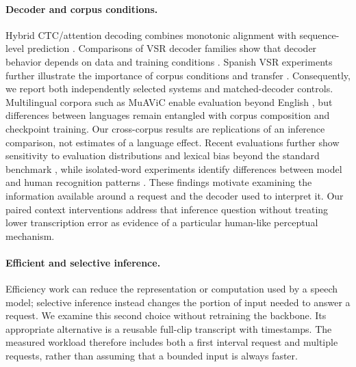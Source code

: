 \paragraph{Decoder and corpus conditions.}
Hybrid CTC/attention decoding combines monotonic alignment with sequence-level
prediction \citep{watanabe2017hybrid}. Comparisons of VSR decoder families show
that decoder behavior depends on data and training conditions
\citep{gimeno2024decoders}. Spanish VSR experiments further illustrate the
importance of corpus conditions and transfer \citep{gimeno2025spanish}.
Consequently, we report both independently selected systems and matched-decoder
controls. Multilingual corpora such as MuAViC enable evaluation beyond English
\citep{anwar2023muavic}, but differences between languages remain entangled with
corpus composition and checkpoint training. Our cross-corpus results are
replications of an inference comparison, not estimates of a language effect.
Recent evaluations further show sensitivity to evaluation distributions and lexical bias
beyond the standard benchmark \citep{lin2026generalisability}, while isolated-word
experiments identify differences between model and human recognition patterns
\citep{jain2026lipreadinggap}. These findings motivate examining the information
available around a request and the decoder used to interpret it. Our paired
context interventions address that inference question without treating lower
transcription error as evidence of a particular human-like perceptual mechanism.

\paragraph{Efficient and selective inference.}
Efficiency work can reduce the representation or computation used by a speech
model; selective inference instead changes the portion of input needed to answer
a request. We examine this second choice without retraining the backbone.
Its appropriate alternative is a reusable full-clip transcript with timestamps.
The measured workload therefore includes both a first interval request and
multiple requests, rather than assuming that a bounded input is always faster.
